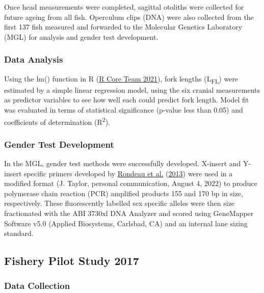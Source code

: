 \documentclass[12pt]{article}\usepackage[]{graphicx}\usepackage[]{color}
\begin{document}
Once head measurements were completed, sagittal otoliths were collected for future ageing from all fish. Operculum clips (DNA) were also collected from the first 137 fish measured and forwarded to the Molecular Genetics Laboratory (MGL) for analysis and gender test development.

\hypertarget{data-analysis}{%
\subsubsection{Data Analysis}\label{data-analysis}}

Using the lm() function in R (\protect\hyperlink{ref-R}{R Core Team 2021}), fork lengths (L\textsubscript{FL}) were estimated by a simple linear regression model, using the six cranial measurements as predictor variables to see how well each could predict fork length. Model fit was evaluated in terms of statistical significance (p-value less than 0.05) and coefficients of determination (R\textsuperscript{2}).

\hypertarget{gender-test-development}{%
\subsubsection{Gender Test Development}\label{gender-test-development}}

In the MGL, gender test methods were successfully developed. X-insert and Y-insert specific primers developed by \protect\hyperlink{ref-Rondeau2013}{Rondeau et al.} (\protect\hyperlink{ref-Rondeau2013}{2013}) were used in a modified format (J. Taylor, personal communication, August 4, 2022) to produce polymerase chain reaction (PCR) amplified products 155 and 170 bp in size, respectively. These fluorescently labelled sex specific alleles were then size fractionated with the ABI 3730xl DNA Analyzer and scored using GeneMapper Software v5.0 (Applied Biosystems, Carlsbad, CA) and an internal lane sizing standard.

\hypertarget{fishery-pilot-study-2017}{%
\subsection{Fishery Pilot Study 2017}\label{fishery-pilot-study-2017}}

\hypertarget{data-collection-1}{%
\subsubsection{Data Collection}\label{data-collection-1}}
\end{document}
